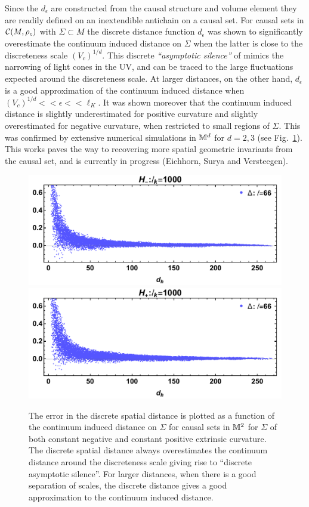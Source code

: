 Since the $d_\epsilon$ are constructed from the causal
structure and volume element they are readily defined on  an inextendible antichain on a causal set.  For causal sets
in $\mathcal C(M,\rho_c)$ with $\Sigma \subset M$ the discrete distance function $d_\epsilon$ was shown to significantly overestimate the
continuum induced distance on $\Sigma$ when the latter is close to the  
discreteness scale $(V_c)^{{1}/{d}}$. This  discrete \emph{``asymptotic silence''} of \cite{ems} mimics the narrowing of
light cones in the UV, and can be traced to the large fluctuations expected around the discreteness scale.  At larger
distances, on the other hand,  $d_\epsilon$ is a good approximation of the continuum induced
distance when $(V_c)^{{1}/{d}}<< \epsilon << \ell_K$.  It was
shown moreover that the  continuum induced distance is slightly underestimated for positive curvature and slightly overestimated  for negative curvature, when restricted
to small regions of $\Sigma$. This was confirmed by extensive  numerical
simulations in $\mathbb M^d$ for $d=2,3$ (see Fig.~\ref{distance.fig}).  This works paves the way to
recovering more spatial geometric invariants from the causal set, and is currently in progress (Eichhorn, Surya and Versteegen).  
\begin{figure}[ht]
  \includegraphics[width=0.5\linewidth, keepaspectratio]{Hnegl66}\quad\quad \includegraphics[width=0.5\linewidth, keepaspectratio]{Hposl66}
\caption{The error in the discrete spatial distance is plotted as a function of the continuum induced distance
    on $\Sigma$ for causal
    sets in $\mathbb M^2$ for  $\Sigma$ of both constant negative and constant positive  extrinsic curvature. The discrete spatial distance always overestimates the continuum distance around the discreteness
    scale giving rise to ``discrete asymptotic silence''. For larger distances, when there is a good separation of
    scales, the discrete distance gives a good approximation to the continuum induced distance.}
\label{distance.fig}
\end{figure}


